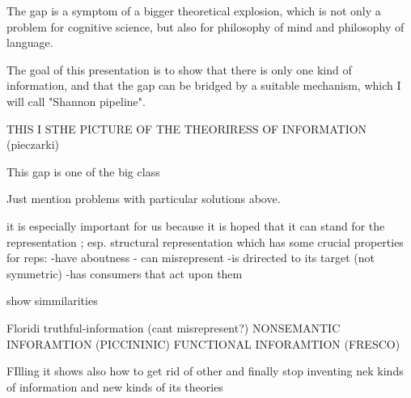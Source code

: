 \documentclass[10pt, aspectratio=169, handout]{beamer}
\begin{document}
\begin{frame}[label=gap2]
    The gap is a symptom of a bigger theoretical explosion, which is not only a problem for cognitive science, but also for philosophy of mind and philosophy of language. 

    The goal of this presentation is to show that there is only one kind of information, and that the gap can be bridged by a suitable mechanism, which I will call "Shannon pipeline".

THIS I STHE PICTURE OF THE THEORIRESS OF INFORMATION 
(pieczarki)

    This gap is  one of the big class 


Just mention problems with particular solutions above.

    it is especially important for us because it is hoped that it can stand for the representation ; esp. structural representation
    which has some crucial properties for reps:
        -have aboutness 
        - can misrepresent
        -is drirected to its target (not symmetric)
        -has consumers that act upon them

show simmilarities

Floridi truthful-information (cant misrepresent?)
NONSEMANTIC INFORAMTION (PICCININIC)
FUNCTIONAL INFORAMTION  (FRESCO)

    FIlling it shows also how to get rid of other and finally stop inventing nek kinds of information and new kinds of its theories


\end{frame}
\end{document}
